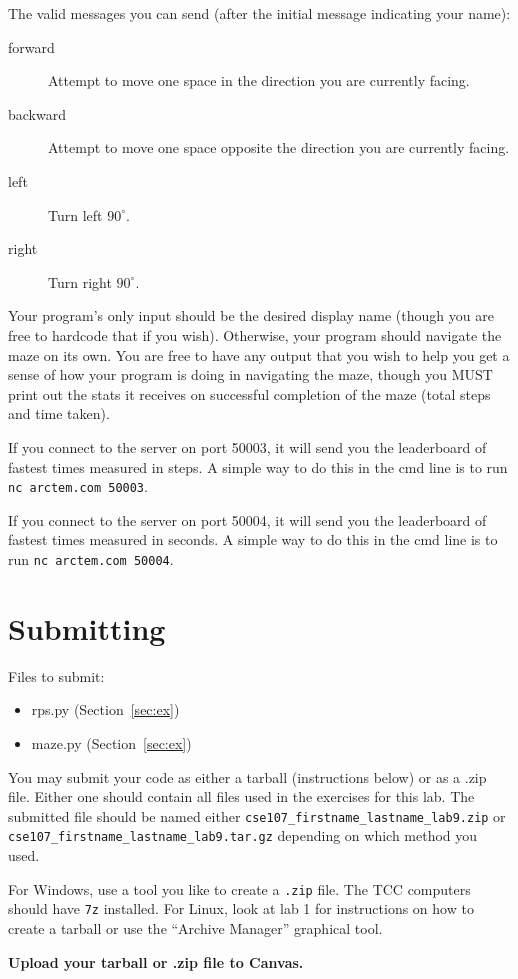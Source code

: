 \documentclass[11pt]{cselabheader}
\begin{document}
\begin{description}
  The valid messages you can send (after the initial message indicating your name):

  \begin{description}
  \item[forward] Attempt to move one space in the direction you are currently facing.
  \item[backward] Attempt to move one space opposite the direction you are currently facing.
  \item[left] Turn left $90^{\circ}$.
  \item[right] Turn right $90^{\circ}$.
  \end{description}

  Your program's only input should be the desired display name (though you are free to hardcode
  that if you wish). Otherwise, your program should navigate the maze on its own. You are free
  to have any output that you wish to help you get a sense of how your program is doing in
  navigating the maze, though you MUST print out the stats it receives on successful completion of
  the maze (total steps and time taken).

  If you connect to the server on port 50003, it will send you the leaderboard of fastest times
  measured in steps. A simple way to do this in the cmd line is to run
  \lstinline{nc arctem.com 50003}.

  If you connect to the server on port 50004, it will send you the leaderboard of fastest times
  measured in seconds. A simple way to do this in the cmd line is to run
  \lstinline{nc arctem.com 50004}.
  
\end{description}

\pagebreak
\section{Submitting}

Files to submit:
\begin{itemize}
\item rps.py (Section~\ref{sec:ex})
\item maze.py (Section~\ref{sec:ex})
\end{itemize}

You may submit your code as either a tarball (instructions below) or as a .zip
file. Either one should contain all files used in the exercises for this lab.
The submitted file should be named either
\texttt{cse107\_firstname\_lastname\_lab9.zip} or
\texttt{cse107\_firstname\_lastname\_lab9.tar.gz} depending on which method you
used.

For Windows, use a tool you like to create a \texttt{.zip} file. The TCC
computers should have \texttt{7z} installed. For Linux, look at lab 1 for
instructions on how to create a tarball or use the ``Archive Manager'' graphical
tool.

\begin{center}
  \textbf{Upload your tarball or .zip file to Canvas.}
\end{center}
\end{document}
